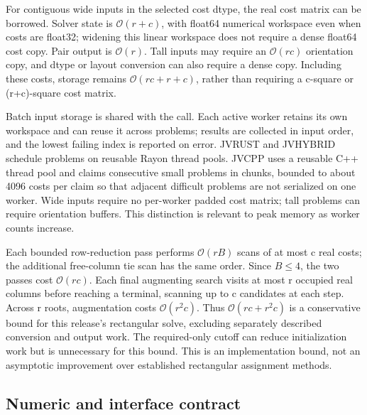 \documentclass[11pt,a4paper]{article}
\begin{document}
For contiguous wide inputs in the selected cost dtype, the real cost matrix can be borrowed. Solver state is \(\mathcal{O}(r+c)\), with float64 numerical workspace even when costs are float32; widening this linear workspace does not require a dense float64 cost copy. Pair output is \(\mathcal{O}(r)\). Tall inputs may require an \(\mathcal{O}(rc)\) orientation copy, and dtype or layout conversion can also require a dense copy. Including these costs, storage remains \(\mathcal{O}(rc+r+c)\), rather than requiring a c-square or (r+c)-square cost matrix.

Batch input storage is shared with the call. Each active worker retains its own workspace and can reuse it across problems; results are collected in input order, and the lowest failing index is reported on error. JVRUST and JVHYBRID schedule problems on reusable Rayon thread pools. JVCPP uses a reusable C++ thread pool and claims consecutive small problems in chunks, bounded to about 4096 costs per claim so that adjacent difficult problems are not serialized on one worker. Wide inputs require no per-worker padded cost matrix; tall problems can require orientation buffers. This distinction is relevant to peak memory as worker counts increase.

Each bounded row-reduction pass performs \(\mathcal{O}(rB)\) scans of at most c real costs; the additional free-column tie scan has the same order. Since \(B\leq4\), the two passes cost \(\mathcal{O}(rc)\). Each final augmenting search visits at most r occupied real columns before reaching a terminal, scanning up to c candidates at each step. Across r roots, augmentation costs \(\mathcal{O}(r^2c)\). Thus \(\mathcal{O}(rc+r^2c)\) is a conservative bound for this release's rectangular solve, excluding separately described conversion and output work. The required-only cutoff can reduce initialization work but is unnecessary for this bound. This is an implementation bound, not an asymptotic improvement over established rectangular assignment methods.

\subsection{Numeric and interface contract}\label{sec:numeric}
\end{document}
